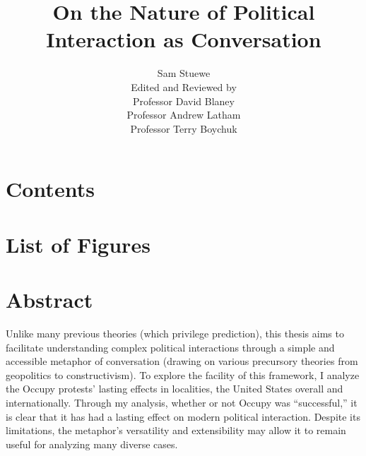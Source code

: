 \documentclass[openany,twoside]{memoir}
\begin{document}
\begin{Spacing}{2}
\title{On the Nature of Political Interaction as Conversation}
\author{Sam Stuewe\\[50ex] Edited and Reviewed by\\ Professor David Blaney\\ Professor Andrew Latham\\ Professor Terry Boychuk}
\date{}
\maketitle
\chapter{Contents}
\makeatletter
{}
\makeatother
\makeatletter
{}
\chapter{List of Figures}
\makeatother
\newpage


\fancyhead[R]{\nouppercase{\leftmark}}

\chapter{Abstract}
\thispagestyle{fancy}
Unlike many previous theories (which privilege prediction), this thesis aims to facilitate understanding complex political interactions through a simple and accessible metaphor of conversation (drawing on various precursory theories from geopolitics to constructivism). 
To explore the facility of this framework, I analyze the Occupy protests' lasting effects in localities, the United States overall and internationally. 
Through my analysis, whether or not Occupy was “successful,” it is clear that it has had a lasting effect on modern political interaction. 
Despite its limitations, the metaphor's versatility and extensibility may allow it to remain useful for analyzing many diverse cases.


\end{Spacing}
\end{document}
